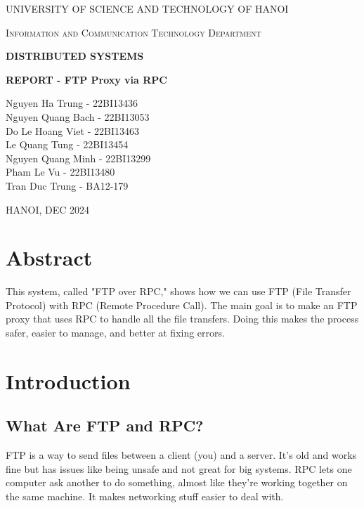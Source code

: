 \documentclass[a4paper,12pt]{article}
\begin{document}
\begin{titlepage}
    \centering
    {\scshape\LARGE UNIVERSITY OF SCIENCE AND TECHNOLOGY OF HANOI\par}
    \vspace{1cm}
    {\scshape\Large Information and Communication Technology Department\par}
    \vspace{2cm}
    {\huge\bfseries DISTRIBUTED SYSTEMS\par}
    \vspace{0.5cm}
    {\huge\bfseries REPORT - FTP Proxy via RPC\par}
    \vfill
    \begin{flushright}
        Nguyen Ha Trung - 22BI13436\\
        Nguyen Quang Bach - 22BI13053\\
        Do Le Hoang Viet - 22BI13463\\
        Le Quang Tung - 22BI13454\\
        Nguyen Quang Minh - 22BI13299\\
        Pham Le Vu - 22BI13480\\
        Tran Duc Trung - BA12-179
    \end{flushright}
    \vfill
    {\large HANOI, DEC 2024\par}
\end{titlepage}

\section{Abstract}
This system, called "FTP over RPC," shows how we can use FTP (File Transfer Protocol) with RPC (Remote Procedure Call). The main goal is to make an FTP proxy that uses RPC to handle all the file transfers. Doing this makes the process safer, easier to manage, and better at fixing errors.

\section{Introduction}
\subsection{What Are FTP and RPC?}
FTP is a way to send files between a client (you) and a server. It’s old and works fine but has issues like being unsafe and not great for big systems. RPC lets one computer ask another to do something, almost like they’re working together on the same machine. It makes networking stuff easier to deal with.
\end{document}
